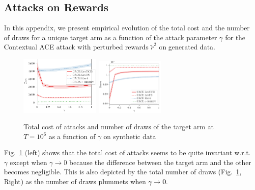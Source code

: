 \subsection{Attacks on Rewards}\label{app:additional_fig_rwds}
In this appendix, we present empirical evolution of the total cost and the number of draws for a unique target arm as a function of the attack parameter $\gamma$ for the Contextual ACE attack with perturbed rewards $\tilde{r}^{2}$ on generated data.

\begin{figure}[h]
    \centering
    \includegraphics[width=0.35\textwidth]{sections/appendix/nips2020-bandits/images/attack_reward/simulations/cost_epsilon.pdf}
    \includegraphics[width=0.3\textwidth]{sections/appendix/nips2020-bandits/images/attack_reward/simulations/draws_epsilon.pdf}
    \caption{Total cost of attacks and number of draws of the target arm at $T = 10^{6}$ as a function of $\gamma$ on synthetic data     \label{fig:synth_cost_draws_gamma}}
\end{figure}

Fig.~\ref{fig:synth_cost_draws_gamma} (left) shows that the total cost of attacks seems to be quite invariant w.r.t.  $\gamma$ except when $\gamma \rightarrow 0$ because the difference between the target arm and the other becomes negligible. This is also depicted by the total number of draws (Fig.~\ref{fig:synth_cost_draws_gamma}, Right) as the number of draws plummets when $\gamma \rightarrow 0$.

